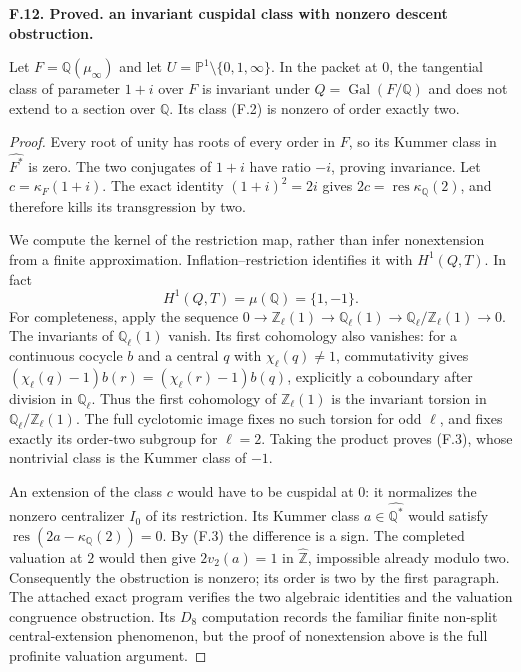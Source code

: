 \documentclass[11pt,oneside]{article}
\makeatletter
\newcounter{statementanchor}
\newenvironment{statement}[3]{%
 \refstepcounter{statementanchor}\def\@currentlabel{#1}%
 \par\addvspace{9pt}\noindent
 \textbf{#1. #2. #3.}\par\nobreak\noindent\ignorespaces
}{\par\addvspace{5pt}}
\makeatother
\begin{document}
\begin{statement}{F.12}{Proved}{an invariant cuspidal class with nonzero descent obstruction}
\label{st:F.12}
\label{F-one-plus-i}
Let $F=\mathbb Q(\mu_\infty)$ and let $U=\mathbb P^1\setminus
\{0,1,\infty\}$. In the packet at $0$, the tangential class of
parameter $1+i$ over $F$ is invariant under
$Q=\operatorname{Gal}(F/\mathbb Q)$ and does not extend to a section
over $\mathbb Q$. Its class (F.2) is nonzero of order exactly two.
\end{statement}
\begin{proof}
Every root of unity has roots of every order in $F$, so its Kummer
class in $\widehat{F^*}$ is zero. The two conjugates of $1+i$
have ratio $-i$, proving invariance. Let $c=\kappa_F(1+i)$.
The exact identity $(1+i)^2=2i$ gives
$2c=\operatorname{res}\kappa_{\mathbb Q}(2)$, and therefore kills
its transgression by two.

We compute the kernel of the restriction map, rather than infer
nonextension from a finite approximation. Inflation--restriction
identifies it with $H^1(Q,T)$. In fact
\[
 H^1(Q,T)=\mu(\mathbb Q)=\{1,-1\}.                            \tag{F.3}
\]
For completeness, apply the sequence
$0\to\mathbb Z_\ell(1)\to\mathbb Q_\ell(1)\to
\mathbb Q_\ell/\mathbb Z_\ell(1)\to0$.
The invariants of $\mathbb Q_\ell(1)$ vanish. Its first cohomology
also vanishes: for a continuous cocycle $b$ and a central $q$ with
$\chi_\ell(q)\ne1$, commutativity gives
$(\chi_\ell(q)-1)b(r)=(\chi_\ell(r)-1)b(q)$, explicitly a
coboundary after division in $\mathbb Q_\ell$. Thus the first
cohomology of $\mathbb Z_\ell(1)$ is the invariant torsion in
$\mathbb Q_\ell/\mathbb Z_\ell(1)$. The full cyclotomic image
fixes no such torsion for odd $\ell$, and fixes exactly its order-two
subgroup for $\ell=2$. Taking the product proves (F.3), whose
nontrivial class is the Kummer class of $-1$.

An extension of the class $c$ would have to be cuspidal at $0$:
it normalizes the nonzero centralizer $I_0$ of its restriction.
Its Kummer class $a\in\widehat{\mathbb Q^*}$ would satisfy
$\operatorname{res}(2a-\kappa_{\mathbb Q}(2))=0$.
By (F.3) the difference is a sign. The completed valuation at $2$
would then give $2v_2(a)=1$ in $\widehat{\mathbb Z}$, impossible
already modulo two. Consequently the obstruction is nonzero;
its order is two by the first paragraph. The attached exact
program verifies the two algebraic identities and the valuation
congruence obstruction. Its $D_8$ computation records the familiar
finite non-split central-extension phenomenon, but the proof of
nonextension above is the full profinite valuation argument.
\end{proof}
\end{document}
